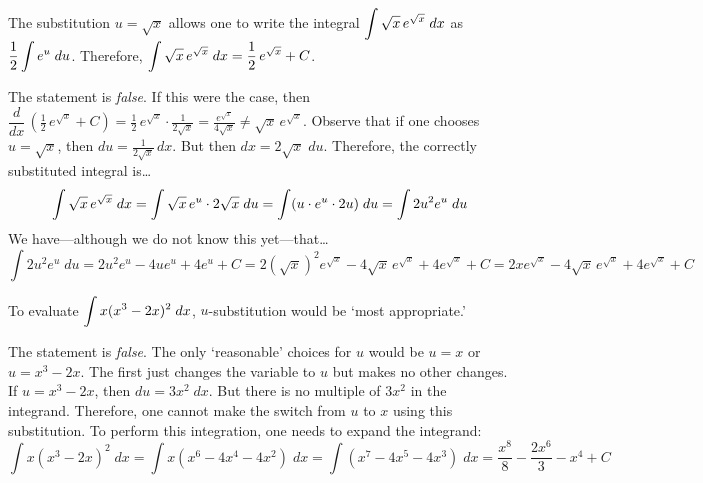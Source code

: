 \documentclass[11pt,letterpaper]{article}
\begin{document}
\newpage



 The substitution $u= \sqrt{x}$ allows one to write the integral $\displaystyle\int\sqrt{x} \, e^{\sqrt{x}}\;dx$ as $\displaystyle\frac{1}{2} \int e^u \;du$. Therefore, $\displaystyle\int \sqrt{x} \, e^{\sqrt{x}} \;dx= \frac{1}{2}\, e^{\sqrt{x}} + C$. \pspace

\sol The statement is \textit{false}. If this were the case, then $\dfrac{d}{dx} \,(\frac{1}{2}\, e^{\sqrt{x}} + C)= \frac{1}{2}\, e^{\sqrt{x}} \cdot \frac{1}{2 \sqrt{x}} = \frac{e^{\sqrt{x}}}{4 \sqrt{x}} \neq \sqrt{x} \, e^{\sqrt{x}}$. Observe that if one chooses $u= \sqrt{x}$, then $du= \frac{1}{2\sqrt{x}} \,dx$. But then $dx= 2 \sqrt{x} \;du$. Therefore, the correctly substituted integral is\dots
	\[
	\displaystyle\int\sqrt{x} \, e^{\sqrt{x}}\;dx= \int \sqrt{x} \, e^u \cdot 2 \sqrt{x} \; du= \int (u \cdot e^u \cdot 2u) \;du= \int 2u^2 e^u \;du
	\]
We have---although we do not know this yet---that\dots
	\[
	 \int 2u^2 e^u \;du= 2 u^2 e^u - 4 u e^u + 4e^u + C= 2 (\sqrt{x})^2 e^{\sqrt{x}} - 4 \sqrt{x}\, e^{\sqrt{x}} + 4e^{\sqrt{x}} + C= 2x e^{\sqrt{x}} - 4 \sqrt{x}\, e^{\sqrt{x}} + 4e^{\sqrt{x}} + C
	\] \pvspace{1.3cm}



 To evaluate $\displaystyle\int x(x^3 - 2x)^2 \;dx$, $u$-substitution would be `most appropriate.' \pspace

\sol The statement is \textit{false}. The only `reasonable' choices for $u$ would be $u= x$ or $u= x^3 - 2x$. The first just changes the variable to $u$ but makes no other changes. If $u= x^3 - 2x$, then $du= 3x^2 \;dx$. But there is no multiple of $3x^2$ in the integrand. Therefore, one cannot make the switch from $u$ to $x$ using this substitution. To perform this integration, one needs to expand the integrand: 
	\[
	\int x(x^3 - 2x)^2 \;dx= \int x(x^6 - 4x^4 - 4x^2) \;dx= \int (x^7 - 4x^5 - 4x^3) \;dx= \dfrac{x^8}{8} - \dfrac{2x^6}{3} - x^4 + C
	\]
\end{document}
